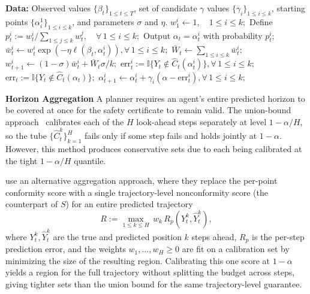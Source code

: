 \begin{algorithm}[t]
\caption{DtACI, taken from~\cite{gibbs2024conformal}.}
\label{eq:dtaci}
\begin{algorithmic}[1]
\STATE \textbf{Data:} Observed values $\{\beta_t\}_{1\le t\le T}$, set of candidate $\gamma$ values $\{\gamma_i\}_{1\le i\le k}$, starting points $\{\alpha_i^1\}_{1\le i\le k}$, and parameters $\sigma$ and $\eta$.
\STATE $w_1^i \leftarrow 1,\quad 1\le i\le k;$ 
\STATE Define $p_t^i := w_t^i/{\sum_{1\le j\le k} w_t^j},\quad \forall\,1\le i\le k;$ 
\STATE Output $\alpha_t=\alpha_t^i$ with probability $p_t^i$; 
\STATE $\bar{w}_t^i \leftarrow w_t^i \exp\!\left(-\eta\ell(\beta_t,\alpha_t^i)\right), \forall\,1\le i\le k;$ 
\STATE $\bar{W}_t \leftarrow \sum_{1\le i\le k} \bar{w}_t^i;$ 
\STATE $w_{t+1}^i \leftarrow (1-\sigma)\bar{w}_t^i+\bar{W}_t\sigma/k;$ 
\STATE $\mathrm{err}_t^i := \mathbb{I}{\{Y_t\notin \hat{C}_t(\alpha_t^i)}\}, \forall\,1\le i\le k;$ 
\STATE $\mathrm{err}_t := \mathbb{I}{\{Y_t\notin \hat{C}_t(\alpha_t)}\};$ 
\STATE $\alpha_{t+1}^i \leftarrow \alpha_t^i + \gamma_i(\alpha-\mathrm{err}_t^i),\forall\,1\le i\le k;$ 
\ENDFOR
\end{algorithmic}
\end{algorithm}

\textbf{Horizon Aggregation} A planner requires an agent's entire predicted horizon to be covered at once for the safety certificate to remain valid. The union-bound approach~\cite{lindemann_safe_2023} calibrates each of the \(H\) look-ahead steps separately at level \(1-\alpha/H\), so the tube \(\{\hat{C}_t^k\}_{k=1}^{H}\) fails only if some step fails and holds jointly at \(1-\alpha\). However, this method produces conservative sets due to each being calibrated at the tight \(1-\alpha/H\) quantile.

\citeauthor{cleaveland_conformal_2024} use an alternative aggregation approach, where they replace the per-point conformity score with a single trajectory-level nonconformity score (the counterpart of \(S\)) for an entire predicted trajectory
\[
R := \max_{1 \le k \le H} \, w_k\, R_p\!\left(Y_t^k, \hat{Y}_t^k\right),
\]
where \(Y_t^k, \hat{Y}_t^k\) are the true and predicted position \(k\) steps ahead, \(R_p\) is the per-step prediction error, and the weights
\(w_1,\dots,w_H \ge 0\) are fit on a calibration set by minimizing the size of the resulting region. Calibrating this one score at \(1-\alpha\) yields a region for the full trajectory without splitting the budget across steps, giving tighter sets than the union bound for the same trajectory-level guarantee.